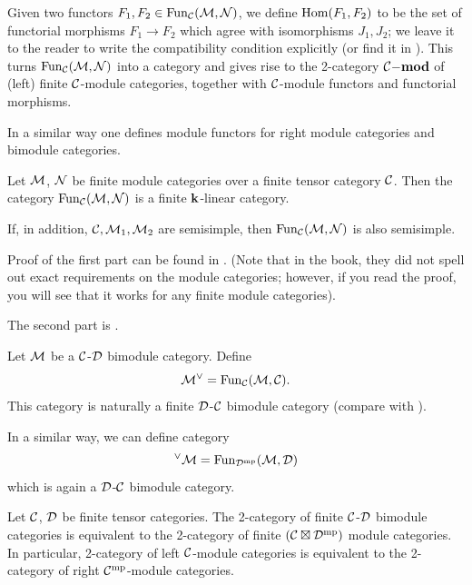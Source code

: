 Given two functors $F_1, F_2\in \operatorname{Fun}_{\mathcal{C}}(\mathcal{M}, \mathcal{N})$, we define
$\operatorname{Hom}(F_1, F_2)$ to be the set of functorial morphisms $F_1\to F_2$ which agree
with isomorphisms $J_1, J_2$; we leave it to the reader to write the
compatibility condition explicitly (or find it in
\cite[Section 7.2]{etingof-fusion}). This turns $\operatorname{Fun}_{\mathcal{C}}(\mathcal{M}, \mathcal{N})$
into a category and gives rise to the 2-category $\mathcal{C}\mathbf{{-}mod}$ of (left) finite
$\mathcal{C}$-module categories, together with $\mathcal{C}$-module functors and functorial
morphisms.

In a similar way one defines module functors for right module categories
and bimodule categories.


\begin{theorem}\label{t:module-functors}
  Let $\mathcal{M}$, $\mathcal{N}$ be finite module categories over a finite tensor
   category $\mathcal{C}$. Then the category $\operatorname{Fun}_{\mathcal{C}}(\mathcal{M}, \mathcal{N})$ is
   a finite $\mathbf{k}$-linear category.

   If, in addition, $\mathcal{C}, \mathcal{M}_1, \mathcal{M}_2$ are semisimple, then
   $\operatorname{Fun}_{\mathcal{C}}(\mathcal{M}, \mathcal{N})$  is also semisimple.
\end{theorem}
Proof of the first part can be found in \cite[Proposition
7.11.6]{etingof-fusion}. (Note that in the book, they did not spell out exact requirements on
the module categories; however, if you read the proof, you will see that it
works for any finite module categories).

The second part is \cite[Theorem 2.16]{eno}.

\begin{example}\label{x:module-cat-dual}
  Let $\mathcal{M}$ be a $\mathcal{C}$-$\mathcal{D}$ bimodule category. Define
  $$
  \mathcal{M}^\vee = \operatorname{Fun}_{\mathcal{C}}(\mathcal{M}, \mathcal{C}).
  $$
  This category is naturally a finite
  $\mathcal{D}$-$\mathcal{C}$ bimodule category (compare with ).

  In a similar way, we can define category
  $$
    {}^\vee\mathcal{M}= \operatorname{Fun}_{\mathcal{D}^{\mathrm{mp}}}(\mathcal{M}, \mathcal{D})
  $$
  which is again a $\mathcal{D}$-$\mathcal{C}$ bimodule category.
\end{example}




\begin{lemma}\label{l:bimodule-2category}
  Let $\mathcal{C}$, $\mathcal{D}$ be finite tensor categories. The 2-category of finite
  $\mathcal{C}$-$\mathcal{D}$ bimodule categories is equivalent to the 2-category of finite
  $(\mathcal{C}\boxtimes \mathcal{D}^{{\mathrm{mp}}})$ module categories. In particular, 2-category
  of
  left $\mathcal{C}$-module categories is equivalent to the 2-category of right
  $\mathcal{C}^{\mathrm{mp}}$-module categories.
\end{lemma}




